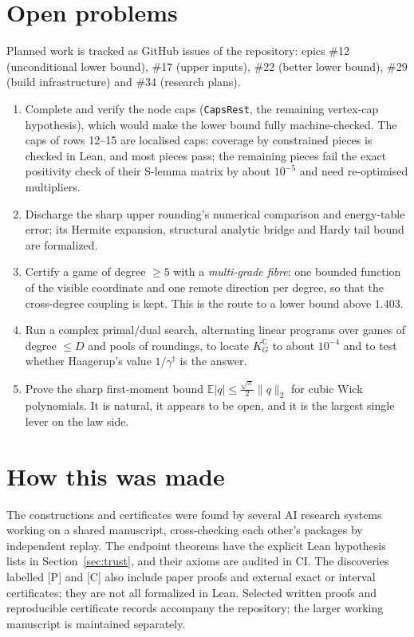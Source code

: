 \documentclass[11pt,a4paper]{article}
\newcommand{\C}{\mathbb{C}}
\newcommand{\E}{\mathbb{E}}
\newcommand{\KG}{K_G^{\C}}
\newcommand{\lean}[1]{\texttt{\small #1}}
\begin{document}
\section{Open problems}
Planned work is tracked as GitHub issues of the repository: epics \#12 (unconditional lower bound), \#17 (upper inputs),
\#22 (better lower bound), \#29 (build infrastructure) and \#34 (research plans).
\begin{enumerate}
\item Complete and verify the node caps (\lean{CapsRest}, the remaining vertex-cap hypothesis), which would make the lower bound fully machine-checked.
 The caps of rows 12--15 are localised caps: coverage by constrained pieces is checked in Lean, and most pieces pass; the
 remaining pieces fail the exact positivity check of their S-lemma matrix by about $10^{-5}$ and need re-optimised multipliers.
\item Discharge the sharp upper rounding's numerical comparison and energy-table error; its Hermite expansion, structural analytic bridge and Hardy tail bound are formalized.
\item Certify a game of degree $\ge5$ with a \emph{multi-grade fibre}: one bounded function of the visible coordinate and one
 remote direction per degree, so that the cross-degree coupling is kept. This is the route to a lower bound above $1.403$.
\item Run a complex primal/dual search, alternating linear programs over games of degree $\le D$ and pools of roundings, to
 locate $\KG$ to about $10^{-4}$ and to test whether Haagerup's value $1/\gamma^\dagger$ is the answer.
\item Prove the sharp first-moment bound $\E|q|\le\frac{\sqrt\pi}{2}\|q\|_2$ for cubic Wick polynomials. It is natural, it
 appears to be open, and it is the largest single lever on the law side.
\end{enumerate}

\section*{How this was made}
The constructions and certificates were found by several AI research systems working on a shared manuscript, cross-checking
each other's packages by independent replay. The endpoint theorems have the explicit Lean hypothesis lists in
Section~\ref{sec:trust}, and their axioms are audited in CI. The discoveries labelled [P] and [C] also include paper proofs
and external exact or interval certificates; they are not all formalized in Lean. Selected written proofs and reproducible certificate records accompany the repository; the larger working manuscript is maintained separately.
\end{document}
